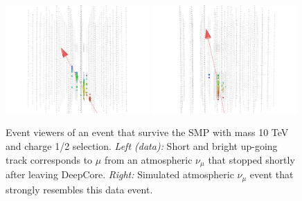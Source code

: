 \begin{appendices}
\begin{figure}
\centering
\includegraphics[width=0.49\textwidth]{appendix/img/FINAL_data_m_10000_ch1ovr2_1.png}
\includegraphics[width=0.49\textwidth]{appendix/img/FINAL_data_m_10000_ch1ovr2_1_NUMUANOLOGY.png}
\caption{Event viewers of an event that survive the SMP with mass 10 TeV and charge 1/2 selection. \textit{Left (data): } Short and bright up-going track corresponds to $\mu$ from an atmospheric $\nu_\mu$ that stopped shortly after leaving DeepCore. \textit{Right: }Simulated atmospheric $\nu_\mu$ event that strongly resembles this data event.}
\label{fig:final_1}
\end{figure}


\end{appendices}
